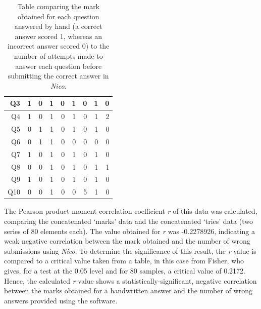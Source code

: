 \documentclass[12pt,twoside,notitlepage,xetex]{report}
\begin{document}
\begin{center}
\begin{table}[H]
\begin{center}
\begin{tabular}{|r||r|r||r|r||r|r||r|r|}
Q3 & 1 & 0 & 1 & 0 & 1 & 0 & 1 & 0\\ \hline
Q4 & 1 & 0 & 1 & 0 & 1 & 0 & 1 & 2\\ \hline
Q5 & 0 & 1 & 1 & 0 & 1 & 0 & 1 & 0\\ \hline
Q6 & 0 & 1 & 1 & 0 & 0 & 0 & 0 & 0\\ \hline
Q7 & 1 & 0 & 1 & 0 & 1 & 0 & 1 & 0\\ \hline
Q8 & 0 & 0 & 1 & 0 & 1 & 0 & 1 & 1\\ \hline
Q9 & 1 & 0 & 1 & 0 & 1 & 0 & 1 & 0\\ \hline
Q10 & 0 & 0 & 1 & 0 & 0 & 5 & 1 & 0\\
\hline
\end{tabular}
\end{center}
\caption{Table comparing the mark obtained for each question answered by hand (a correct answer scored 1, whereas an incorrect answer scored 0) to the number of attempts made to answer each question before submitting the correct answer in \emph{Nico}.}
\label{tab:MarksTries}
\end{table}
\end{center}

The Pearson product-moment correlation coefficient \emph{r} of this data was calculated, comparing the concatenated `marks' data and the concatenated `tries' data (two series of 80 elements each).  The value obtained for \emph{r} was -0.2278926, indicating a weak negative correlation between the mark obtained and the number of wrong submissions using \emph{Nico}.  To determine the significance of this result, the \emph{r} value is compared to a critical value taken from a table, in this case from Fisher, who gives, for a test at the 0.05 level and for 80 samples, a critical value of 0.2172. \cite{Fisher1990}  Hence, the calculated \emph{r} value shows a statistically-significant, negative correlation between the marks obtained for a handwritten answer and the number of wrong answers provided using the software.
\end{document}

